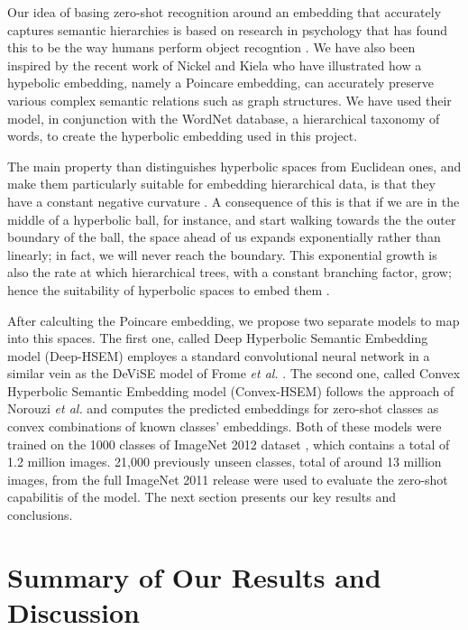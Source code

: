 \documentclass[12pt]{report}
\begin{document}
Our idea of basing zero-shot recognition around an embedding that accurately captures semantic hierarchies is based on research in psychology that has found this to be the way humans perform object recogntion \cite{Rosch1976, Joliceur1984}. We have also been inspired by the recent work of Nickel and Kiela \cite{Nickel2017} who have illustrated how a hypebolic embedding, namely a Poincare embedding, can accurately preserve various complex semantic relations such as graph structures. We have used their model, in conjunction with the WordNet database\cite{Miller1995}, a hierarchical taxonomy of words, to create the hyperbolic embedding used in this project.

The main property than distinguishes hyperbolic spaces from Euclidean ones, and make them particularly suitable for embedding hierarchical data, is that they have a constant negative curvature \cite{Greenberg1994}. A consequence of this is that if we are in the middle of a hyperbolic ball, for instance, and start walking towards the the outer boundary of the ball, the space ahead of us expands exponentially rather than linearly; in fact, we will never reach the boundary. This exponential growth is also the rate at which hierarchical trees, with a constant branching factor, grow; hence the suitability of hyperbolic spaces to embed them \cite{Nickel2017, Chamberlain2017}.

After calculting the Poincare embedding, we propose two separate models to map into this spaces. The first one, called Deep Hyperbolic Semantic Embedding model (Deep-HSEM) employes a standard convolutional neural network in a similar vein as the DeViSE model of Frome \textit{et al.} \cite{Frome2013}. The second one, called Convex Hyperbolic Semantic Embedding model (Convex-HSEM) follows the approach of Norouzi \textit{et al.} \cite{Norouzi2013} and computes the predicted embeddings for zero-shot classes as convex combinations of known classes' embeddings. Both of these models were trained on the 1000 classes of ImageNet 2012 dataset \cite{JiaDeng2009, Russakovsky2015}, which contains a total of 1.2 million images. 21,000 previously unseen classes, total of around 13 million images, from the full ImageNet 2011 release \cite{JiaDeng2009} were used to evaluate the zero-shot capabilitis of the model. The next section presents our key results and conclusions.

\section{Summary of Our Results and Discussion}
\end{document}
